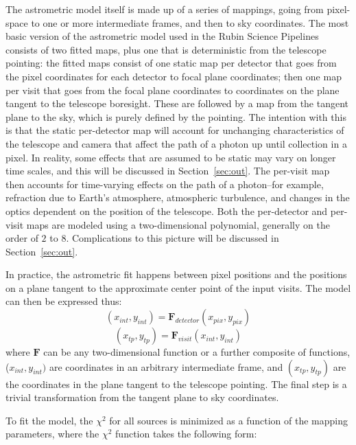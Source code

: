 \documentclass[DM,authoryear,toc]{lsstdoc}
\begin{document}
The astrometric model itself is made up of a series of mappings, going from pixel-space to one or more intermediate frames, and then to sky coordinates. The most basic version of the astrometric model used in the Rubin Science Pipelines consists of two fitted maps, plus one that is deterministic from the telescope pointing: the fitted maps consist of one static map per detector that goes from the pixel coordinates for each detector to focal plane coordinates; then one map per visit that goes from the focal plane coordinates to coordinates on the plane tangent to the telescope boresight. These are followed by a map from the tangent plane to the sky, which is purely defined by the pointing. The intention with this is that the static per-detector map will account for unchanging characteristics of the telescope and camera that affect the path of a photon up until collection in a pixel. In reality, some effects that are assumed to be static may vary on longer time scales, and this will be discussed in Section~\ref{sec:out}. The per-visit map then accounts for time-varying effects on the path of a photon--for example, refraction due to Earth's atmosphere, atmospheric turbulence, and changes in the optics dependent on the position of the telescope. Both the per-detector and per-visit maps are modeled using a two-dimensional polynomial, generally on the order of $2$ to $8$. Complications to this picture will be discussed in Section~\ref{sec:out}.

In practice, the astrometric fit happens between pixel positions and the positions on a plane tangent to the approximate center point of the input visits. The model can then be expressed thus:
\begin{equation}
(x_{int}, y_{int}) = \symbf{F}_{detector} (x_{pix}, y_{pix})
\end{equation}
\begin{equation}
(x_{tp}, y_{tp}) = \symbf{F}_{visit} (x_{int}, y_{int})
\end{equation}
where $\symbf{F}$ can be any two-dimensional function or a further composite of functions, ($x_{int}, y_{int})$ are coordinates in an arbitrary intermediate frame, and $(x_{tp}, y_{tp})$ are the coordinates in the plane tangent to the telescope pointing. The final step is a trivial transformation from the tangent plane to sky coordinates.

To fit the model, the $\chi^2$ for all sources is minimized as a function of the mapping parameters, where the $\chi^2$ function takes the following form:
\end{document}

